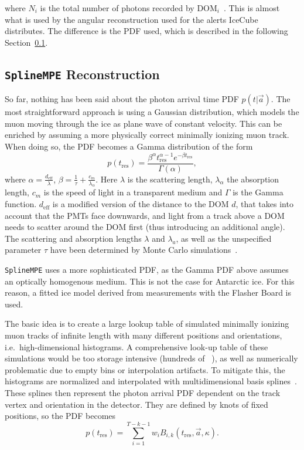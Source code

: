 where $N_i$ is the total number of photons recorded by $\text{DOM}_i$~\cite{Ahrens2004}. This is almost what is used by the angular reconstruction used for the alerts IceCube distributes. The difference is the PDF used, which is described in the following Section~\ref{spline_mpe}.

\subsection{\texttt{SplineMPE} Reconstruction}\label{spline_mpe}
So far, nothing has been said about the photon arrival time PDF $p(t|\vec{a})$. The most straightforward approach is using a Gaussian distribution, which models the muon moving through the ice as plane wave of constant velocity. This can be enriched by assuming a more physically correct minimally ionizing muon track. When doing so, the PDF becomes a Gamma distribution of the form
\begin{equation}
    p(t_\text{res}) = \frac{\beta^\alpha t_\text{res}^{\alpha-1} e^{-\beta t_\text{res}}}{\Gamma(\alpha)},
\end{equation}
where $\alpha=\frac{d_\text{eff}}{\lambda}$, $\beta=\frac{1}{\tau} + \frac{c_m}{\lambda_\alpha}$. Here $\lambda$ is the scattering length, $\lambda_\alpha$ the absorption length, $c_m$ is the speed of light in a transparent medium and $\Gamma$ is the Gamma function. $d_\text{eff}$ is a modified version of the distance to the DOM $d$, that takes into account that the PMTs face downwards, and light from a track above a DOM needs to scatter around the DOM first (thus introducing an additional angle). The scattering and absorption lengths $\lambda$ and $\lambda_a$, as well as the unspecified parameter $\tau$ have been determined by Monte Carlo simulations~.

\texttt{SplineMPE} uses a more sophisticated PDF, as the Gamma PDF above assumes an optically homogenous medium. This is not the case for Antarctic ice. For this reason, a fitted ice model derived from measurements with the Flasher Board is used.

The basic idea is to create a large lookup table of simulated minimally ionizing muon tracks of infinite length with many different positions and orientations, i.e.\ high-dimensional histograms. A comprehensive look-up table of these simulations would be too storage intensive (hundreds of \unit{\giga\byte}), as well as numerically problematic due to empty bins or interpolation artifacts. To mitigate this, the histograms are normalized and interpolated with multidimensional basis splines~. These splines then represent the photon arrival PDF dependent on the track vertex and orientation in the detector. They are defined by knots of fixed positions, so the PDF becomes
\begin{equation}
    p(t_\text{res}) = \sum_{i=1}^{T-k-1} w_i B_{i,k}(t_\text{res},\vec{a}, \kappa).
\end{equation}

